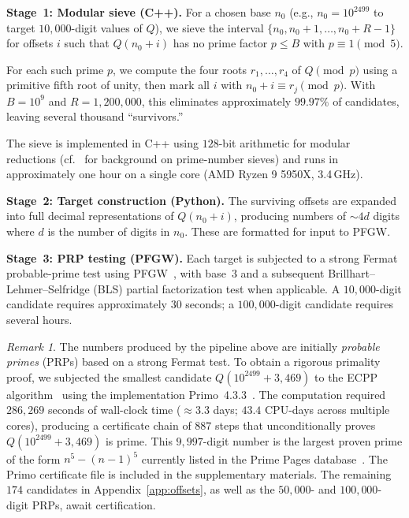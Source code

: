\documentclass[11pt,a4paper]{article}
\theoremstyle{plain}
\theoremstyle{definition}
\theoremstyle{remark}
\newtheorem{remark}[theorem]{Remark}
\begin{document}
\medskip
\noindent\textbf{Stage~1: Modular sieve (C++).}
For a chosen base $n_0$ (e.g., $n_0 = 10^{2499}$ to target $10{,}000$-digit values of $Q$), we sieve the interval $\{n_0, n_0{+}1, \ldots, n_0{+}R-1\}$ for offsets $i$ such that $Q(n_0 + i)$ has no prime factor $p \le B$ with $p \equiv 1 \pmod{5}$.

For each such prime $p$, we compute the four roots $r_1, \ldots, r_4$ of $Q \pmod{p}$ using a primitive fifth root of unity, then mark all $i$ with $n_0 + i \equiv r_j \pmod{p}$. With $B = 10^9$ and $R = 1{,}200{,}000$, this eliminates approximately $99.97\%$ of candidates, leaving several thousand ``survivors.''

The sieve is implemented in C++ using $128$-bit arithmetic for modular reductions (cf.~\cite{pritchard1987,sorenson1998} for background on prime-number sieves) and runs in approximately one hour on a single core (AMD Ryzen 9 5950X, 3.4\,GHz).

\medskip
\noindent\textbf{Stage~2: Target construction (Python).}
The surviving offsets are expanded into full decimal representations of $Q(n_0 + i)$, producing numbers of $\sim 4d$ digits where $d$ is the number of digits in $n_0$. These are formatted for input to PFGW.

\medskip
\noindent\textbf{Stage~3: PRP testing (PFGW).}
Each target is subjected to a strong Fermat probable-prime test using PFGW~\cite{pfgw}, with base~$3$ and a subsequent Brillhart--Lehmer--Selfridge (BLS) partial factorization test when applicable. A $10{,}000$-digit candidate requires approximately $30$ seconds; a $100{,}000$-digit candidate requires several hours.

\begin{remark}
The numbers produced by the pipeline above are initially \emph{probable primes} (PRPs) based on a strong Fermat test.  To obtain a rigorous primality proof, we subjected the smallest candidate $Q(10^{2499} + 3{,}469)$ to the ECPP algorithm~\cite{atkinmorain1993} using the implementation Primo~4.3.3~\cite{primo}. The computation required $286{,}269$ seconds of wall-clock time ($\approx 3.3$ days; $43.4$ CPU-days across multiple cores), producing a certificate chain of $887$ steps that unconditionally proves $Q(10^{2499} + 3{,}469)$ is prime. This $9{,}997$-digit number is the largest proven prime of the form $n^5 - (n-1)^5$ currently listed in the Prime Pages database~\cite{primepages}. The Primo certificate file is included in the supplementary materials. The remaining $174$ candidates in Appendix~\ref{app:offsets}, as well as the $50{,}000$- and $100{,}000$-digit PRPs, await certification.
\end{remark}
\end{document}

